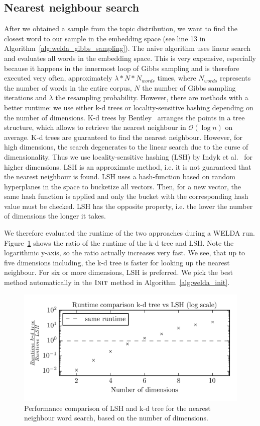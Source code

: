 \documentclass[
        a4paper,
        titlepage,
        twoside,
        parskip,
        numbers=noenddot
        ]{scrbook}
\theoremstyle{break}
\begin{document}
\subsection{Nearest neighbour search}
After we obtained a sample from the topic distribution, we want to find the closest word to our sample in the embedding space (see line 13 in Algorithm~\ref{alg:welda_gibbs_sampling}).
The naive algorithm uses linear search and evaluates all words in the embedding space.
This is very expensive, especially because it happens in the innermost loop of Gibbs sampling and is therefore executed very often, approximately $\lambda * N * N_{words}$ times, where $N_{words}$ represents the number of words in the entire corpus, $N$ the number of Gibbs sampling iterations and   $\lambda$ the resampling probability.
However, there are methods with a better runtime: we use either k-d trees or locality-sensitive hashing depending on the number of dimensions.
K-d trees by Bentley~\cite{Bentley1975} arranges the points in a tree structure, which allows to retrieve the nearest neighbour in $\mathcal{O}(\log n)$ on average.
K-d trees are guaranteed to find the nearest neighbour.
However, for high dimensions, the search degenerates to the linear search due to the curse of dimensionality.
Thus we use locality-sensitive hashing (LSH) by Indyk et al.~\cite{Indyk1998} for higher dimensions.
LSH is an approximate method, i.e. it is not guaranteed that the nearest neighbour is found.
LSH uses a hash-function based on random hyperplanes in the space to bucketize all vectors.
Then, for a new vector, the same hash function is applied and only the bucket with the corresponding hash value must be checked.
LSH has the opposite property, i.e. the lower the number of dimensions the longer it takes.

We therefore evaluated the runtime of the two approaches during a WELDA run.
Figure~\ref{fig:lsh_vs_kdtree} shows the ratio of the runtime of the k-d tree and LSH.
Note the logarithmic y-axis, so the ratio actually increases very fast.
We see, that up to five dimensions including, the k-d tree is faster for looking up the nearest neighbour.
For six or more dimensions, LSH is preferred.
We pick the best method automatically in the $\textsc{Init}$ method in Algorithm~\ref{alg:welda_init}.
\begin{figure}
       \centering
       \includegraphics[width=12cm]{figures/lsh_vs_kdtree.png}
       \caption{Performance comparison of LSH and k-d tree for the nearest neighbour word search, based on the number of dimensions.}
       \label{fig:lsh_vs_kdtree}
\end{figure}
\end{document}
